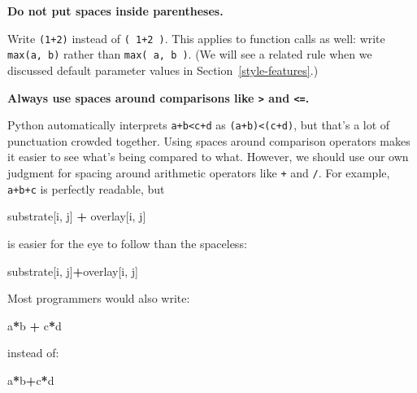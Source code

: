 \documentclass[
]{krantz}
\makeatletter
\newenvironment{Shaded}{\begin{snugshade}}{\end{snugshade}}
\newcommand{\NormalTok}[1]{#1}
\newcommand{\OperatorTok}[1]{\textcolor[rgb]{0.81,0.36,0.00}{\textbf{#1}}}
\newenvironment{kframe}{%
\medskip{}
\setlength{\fboxsep}{.8em}
 \def\at@end@of@kframe{}%
 \ifinner\ifhmode%
  \def\at@end@of@kframe{\end{minipage}}%
  \begin{minipage}{\columnwidth}%
 \fi\fi%
 \def\FrameCommand##1{\hskip\@totalleftmargin \hskip-\fboxsep
 \colorbox{shadecolor}{##1}\hskip-\fboxsep
     \hskip-\linewidth \hskip-\@totalleftmargin \hskip\columnwidth}%
 \MakeFramed {\advance\hsize-\width
   \@totalleftmargin\z@ \linewidth\hsize
   \@setminipage}}%
 {\par\unskip\endMakeFramed%
 \at@end@of@kframe}
\renewenvironment{Shaded}{\begin{kframe}}{\end{kframe}}
\makeatother
\begin{document}
\textbf{Do not put spaces inside parentheses.}

Write \texttt{(1+2)} instead of \texttt{(~1+2~)}.
This applies to function calls as well:
write \texttt{max(a,\ b)} rather than \texttt{max(~a,~b~)}.
(We will see a related rule when we discussed default parameter values
in Section~\ref{style-features}.)

\textbf{Always use spaces around comparisons like \texttt{\textgreater{}} and \texttt{\textless{}=}.}

Python automatically interprets \texttt{a+b\textless{}c+d} as \texttt{(a+b)\textless{}(c+d)},
but that's a lot of punctuation crowded together.
Using spaces around comparison operators makes it easier to see
what's being compared to what.
However,
we should use our own judgment for spacing around arithmetic operators like \texttt{+} and \texttt{/}.
For example,
\texttt{a+b+c} is perfectly readable,
but

\begin{Shaded}
\begin{Highlighting}[]
\NormalTok{substrate[i, j] }\OperatorTok{+}\NormalTok{ overlay[i, j]}
\end{Highlighting}
\end{Shaded}

is easier for the eye to follow than the spaceless:

\begin{Shaded}
\begin{Highlighting}[]
\NormalTok{substrate[i, j]}\OperatorTok{+}\NormalTok{overlay[i, j]}
\end{Highlighting}
\end{Shaded}

Most programmers would also write:

\begin{Shaded}
\begin{Highlighting}[]
\NormalTok{a}\OperatorTok{*}\NormalTok{b }\OperatorTok{+}\NormalTok{ c}\OperatorTok{*}\NormalTok{d}
\end{Highlighting}
\end{Shaded}

instead of:

\begin{Shaded}
\begin{Highlighting}[]
\NormalTok{a}\OperatorTok{*}\NormalTok{b}\OperatorTok{+}\NormalTok{c}\OperatorTok{*}\NormalTok{d}
\end{Highlighting}
\end{Shaded}
\end{document}

